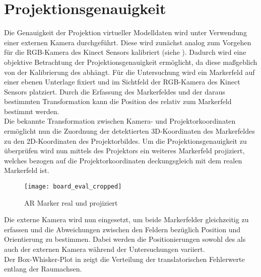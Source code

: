 \section{Projektionsgenauigkeit}
Die Genauigkeit der Projektion virtueller Modelldaten wird unter Verwendung einer externen Kamera durchgeführt. Diese wird zunächst analog zum Vorgehen für die RGB-Kamera des Kinect Sensors kalibriert (siehe ). Dadurch wird eine objektive Betrachtung der Projektionsgenauigkeit ermöglicht, da diese maßgeblich von der Kalibrierung des  abhängt. Für die Untersuchung wird ein Markerfeld auf einer ebenen Unterlage fixiert und im Sichtfeld der RGB-Kamera des Kinect Sensors platziert. Durch die Erfassung des Markerfeldes und der daraus bestimmten Transformation kann die Position des  relativ zum Markerfeld bestimmt werden.\\

Die bekannte Transformation zwischen Kamera- und Projektorkoordinaten ermöglicht nun die Zuordnung der detektierten 3D-Koordinaten des Markerfeldes zu den 2D-Koordinaten des Projektorbildes. Um die Projektionsgenauigkeit zu überprüfen wird nun mittels des Projektors ein weiteres Markerfeld projiziert, welches bezogen auf die Projektorkoordinaten deckungsgleich mit dem realen Markerfeld ist. \\

\begin{figure}[!ht]
	\begin{center}
		\texttt{[image: board\_eval\_cropped]}
		\caption{AR Marker real und projiziert}
		\label{fig.arprojected}
	\end{center}
\end{figure}

Die externe Kamera wird nun eingesetzt, um beide Markerfelder gleichzeitig zu erfassen und die Abweichungen zwischen den Feldern bezüglich Position und Orientierung zu bestimmen. Dabei werden die Positionierungen sowohl des  als auch der externen Kamera während der Untersuchungen variiert. \red[Die Bestimmung der Fehlerwerte erfolgt erneut über Berechnung des QMW.\\
Die Ergebnisse der $n=6$ Messreihen sind in \tab{projection} zusammengefasst.]\\
Der Box-Whisker-Plot in  zeigt die Verteilung der translatorischen Fehlerwerte entlang der Raumachsen.\\

